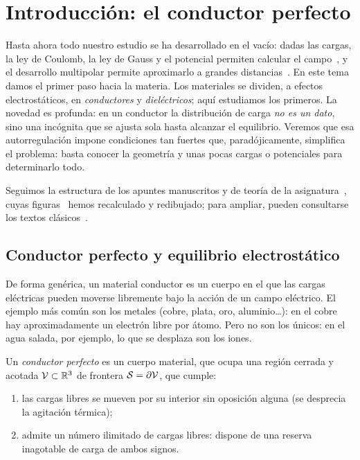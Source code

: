 \section{Introducción: el conductor perfecto}\label{sec:intro}
Hasta ahora todo nuestro estudio se ha desarrollado en el vacío: dadas las cargas, la ley de Coulomb, la ley de Gauss y el potencial
permiten calcular el campo~\cite{TEMA1}, y el desarrollo multipolar permite aproximarlo a grandes distancias~\cite{TEMA2}. En este tema
damos el primer paso hacia la materia. Los materiales se dividen, a efectos electrostáticos, en \emph{conductores} y \emph{dieléctricos};
aquí estudiamos los primeros. La novedad es profunda: en un conductor la distribución de carga \emph{no es un dato}, sino una incógnita que
se ajusta sola hasta alcanzar el equilibrio. Veremos que esa autorregulación impone condiciones tan fuertes que, paradójicamente, simplifica
el problema: basta conocer la geometría y unas pocas cargas o potenciales para determinarlo todo.

Seguimos la estructura de los apuntes manuscritos y de teoría de la asignatura~\cite{APUNTES-T3}, cuyas figuras~\cite{FIGURAS-T3} hemos
recalculado y redibujado; para ampliar, pueden consultarse los textos clásicos~\cite{GRIFFITHS,WANGSNESS,VICTORIANO,PURCELL,FEYNMAN}.

\subsection{Conductor perfecto y equilibrio electrostático}\label{sec:conductor-perfecto}
De forma genérica, un material conductor es un cuerpo en el que las cargas eléctricas pueden moverse libremente bajo la acción de un campo
eléctrico. El ejemplo más común son los metales (cobre, plata, oro, aluminio\ldots): en el cobre hay aproximadamente un electrón libre por
átomo. Pero no son los únicos: en el agua salada, por ejemplo, lo que se desplaza son los iones.

\begin{definicion}\label{def:conductor}
Un \emph{conductor perfecto} es un cuerpo material, que ocupa una región cerrada y acotada $\mathcal{V}\subset\mathbb{R}^{3}$ de frontera $\mathcal{S}=\partial\mathcal{V}$,
que cumple:
\begin{enumerate}[label=(\roman*)]
  \item las cargas libres se mueven por su interior sin oposición alguna (se desprecia la agitación térmica);
  \item admite un número ilimitado de cargas libres: dispone de una reserva inagotable de carga de ambos signos.
\end{enumerate}
\end{definicion}

